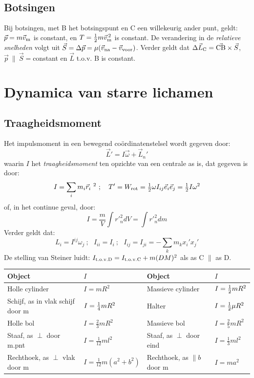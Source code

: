 \documentclass[twoside]{report}
\begin{document}
\subsection{Botsingen}
Bij botsingen, met B het botsingspunt en C een willekeurig ander punt, geldt:\\
$\vec{p}=m\vec{v}_{\rm m}$ is constant, en $T=\mbox{$\frac{1}{2}$} m\vec{v}_{\rm m}^{\,2}$ is
constant. De verandering in de {\it relatieve snelheden} volgt uit
$\vec{S}=\Delta\vec{p}=\mu(\vec{v}_{\rm na}-\vec{v}_{\rm voor})$. Verder geldt dat
$\Delta\vec{L}_{\rm C}=\vec{\rm CB}\times\vec{S}$,
$\vec{p}~\parallel~\vec{S}=$constant en $\vec{L}$ t.o.v. B is constant.

\section{Dynamica van starre lichamen}
\subsection{Traagheidsmoment}
Het impulsmoment in een bewegend co\"ordinatenstelsel wordt gegeven door:
\[
\vec{L}'=I\vec{\omega}+\vec{L}_n'
\]
waarin $I$ het {\it traagheidsmoment} ten opzichte van een centrale as is,
dat gegeven is door:
\[
I=\sum\limits_i m_i\vec{r}_i~^2~;~~~T'=W_{\rm rot}=\mbox{$\frac{1}{2}$}\omega I_{ij}\vec{e}_i\vec{e}_j=\mbox{$\frac{1}{2}$} I\omega^2
\]
of, in het continue geval, door:
\[
I=\frac{m}{V}\int{r'}^2_ndV=\int{r'}^2_ndm
\]
Verder geldt dat:
\[
L_i=I^{ij}\omega_j~;~~~I_{ii}=I_i~;~~~I_{ij}=I_{ji}=-\sum\limits_km_kx_i'x_j'
\]
De stelling van Steiner luidt: $I_{\rm t.o.v. D}=I_{\rm t.o.v. C}+m(DM)^2$
als as C $\parallel$ as D.
\begin{center}
\begin{tabular}{||l|l||l|l||}
\hline
{\bf Object}&$I$&{\bf Object}&$I$\\
\hline
\hline
\rule{0pt}{15pt}Holle cylinder                   &$I=mR^2$             &Massieve cylinder &$I=\mbox{$\frac{1}{2}$} mR^2$\\
\rule{0pt}{15pt}Schijf, as in vlak schijf door m &$I=\mbox{$\frac{1}{4}$} mR^2$      &Halter            &$I=\mbox{$\frac{1}{2}$}\mu R^2$\\
\rule{0pt}{15pt}Holle bol                        &$I=\frac{2}{3}mR^2$  &Massieve bol      &$I=\frac{2}{5}mR^2$\\
\rule{0pt}{15pt}Staaf, as $\perp$ door m.pnt     &$I=\frac{1}{12}ml^2$ &Staaf, as $\perp$ door eind &$I=\frac{1}{3}ml^2$\\
\rule[-5pt]{0pt}{20pt}Rechthoek, as $\perp$ vlak door m&$I=\frac{1}{12}m(a^2+b^2)$&Rechthoek, as $\parallel b$ door m &$I=ma^2$\\
\hline
\end{tabular}
\end{center}
\end{document}
